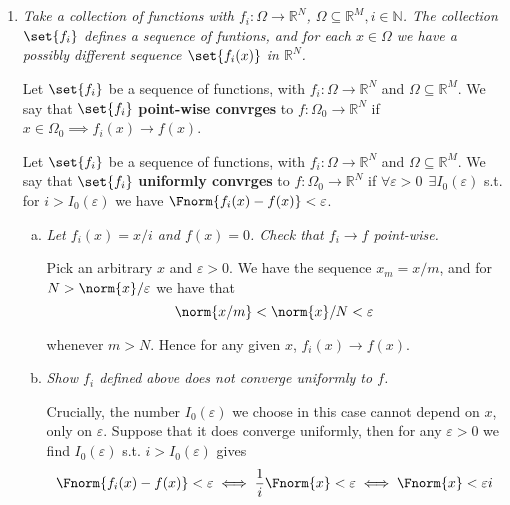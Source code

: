 \documentclass{article}
\begin{document}
\displayoptions

\section{}

\begin{enumerate}[1.]
  \item {\itshape
    Take a collection of functions with $f_i: \Omega \to \mathbb{R}^N$, $\Omega \subseteq \mathbb{R}^M, i \in \mathbb{N}$. The collection $\set{f_i}$ defines a sequence of funtions, and for each $x \in \Omega$ we have a possibly different sequence $\set{f_i(x)}$ in $\mathbb{R}^N$.

    Let $\set{f_i}$ be a sequence of functions, with $f_i: \Omega \to \mathbb{R}^N$ and $\Omega \subseteq \mathbb{R}^M$. We say that $\set{f_i}$ \textbf{point-wise convrges} to $f: \Omega_0 \to \mathbb{R}^N$ if $x \in \Omega_0 \implies f_i(x) \to f(x)$.

    Let $\set{f_i}$ be a sequence of functions, with $f_i: \Omega \to \mathbb{R}^N$ and $\Omega \subseteq \mathbb{R}^M$. We say that $\set{f_i}$ \textbf{uniformly convrges} to $f: \Omega_0 \to \mathbb{R}^N$ if $\forall \varepsilon > 0 ~~ \exists I_0(\varepsilon)$ s.t. for $i > I_0(\varepsilon)$ we have $\Fnorm{f_i(x) - f(x)} < \varepsilon$. }

    \begin{enumerate}[a)]
      \item \textit{Let $f_i(x) = x / i$ and $f(x) = 0$. Check that $f_i \to f$ point-wise.}

        \solution Pick an arbitrary $x$ and $\varepsilon > 0$. We have the sequence $x_m = x / m$, and for $N > \norm{x} / \varepsilon$ we have that
        \[
          \norm{x / m} < \norm{x} / N < \varepsilon
        \]

        whenever $m > N$. Hence for any given $x$, $f_i(x) \to f(x)$.

      \item \textit{Show $f_i$ defined above does not converge uniformly to $f$.}

        \solution Crucially, the number $I_0(\varepsilon)$ we choose in this case cannot depend on $x$, only on $\varepsilon$. Suppose that it does converge uniformly, then for any $\varepsilon > 0$ we find $I_0(\varepsilon)$ s.t. $i > I_0(\varepsilon)$ gives
        \[
          \Fnorm{f_i(x) - f(x)} < \varepsilon
          \iff
          \dfrac{1}{i} \Fnorm{x} < \varepsilon
          \iff
          \Fnorm{x} < \varepsilon i
        \]


\end{enumerate}
\end{enumerate}
\end{document}
